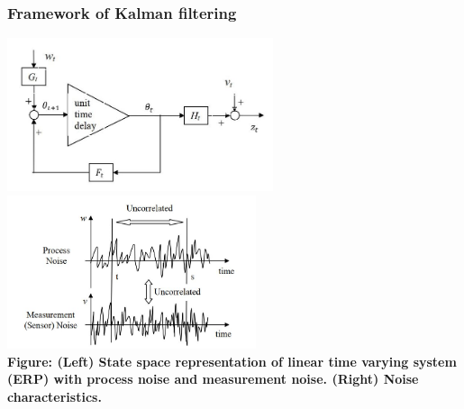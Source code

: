 \documentclass[a4 paper]{article}
\begin{document}
\subsubsection{Framework of Kalman filtering}
\begin{center}
    \includegraphics[height=4.5cm]{figure/state_space_representation_new.JPG}
    \includegraphics[height=4.5cm]{figure/noise_characteristic.JPG}
    \\\textbf{Figure: (Left) State space representation of linear time varying system (ERP) with process noise and measurement noise. (Right) Noise characteristics.}
\end{center}
\end{document}

